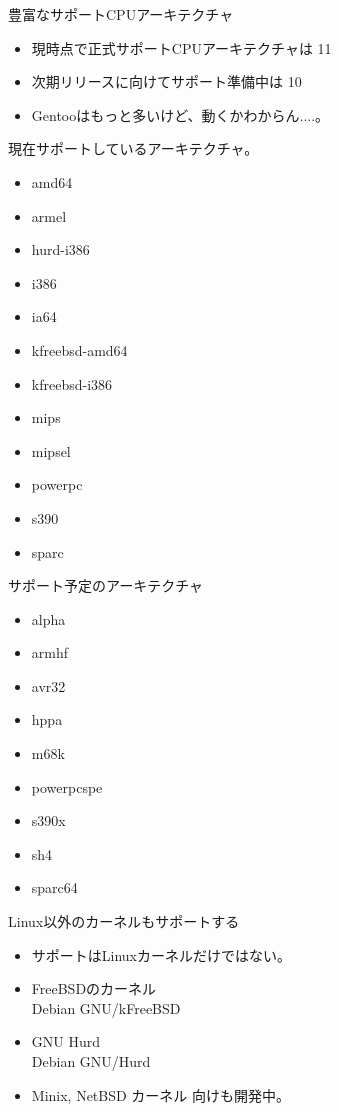 \begin{frame}{豊富なサポートCPUアーキテクチャ}
\begin{itemize}
\item 現時点で正式サポートCPUアーキテクチャは 11
\item 次期リリースに向けてサポート準備中は 10
\item Gentooはもっと多いけど、動くかわからん....。
\end{itemize}

\begin{minipage}[t]{0.5\hsize}

現在サポートしているアーキテクチャ。
\begin{itemize}
  \item amd64
  \item armel
  \item hurd-i386
  \item i386
  \item ia64
  \item kfreebsd-amd64
  \item kfreebsd-i386
  \item mips
  \item mipsel
  \item powerpc
  \item s390
  \item sparc
\end{itemize}

\end{minipage}
\begin{minipage}[t]{0.5\hsize}

サポート予定のアーキテクチャ
\begin{itemize}
  \item alpha
  \item armhf
  \item avr32
  \item hppa
  \item m68k
  \item powerpcspe
  \item s390x
  \item sh4
  \item sparc64
\end{itemize}

\end{minipage}

\end{frame}



\begin{frame}{Linux以外のカーネルもサポートする}
\begin{itemize}
\item サポートはLinuxカーネルだけではない。
\item FreeBSDのカーネル \\
Debian GNU/kFreeBSD 
\item GNU Hurd \\
Debian GNU/Hurd
\item Minix, NetBSD カーネル 向けも開発中。

\end{itemize}

\end{frame}

